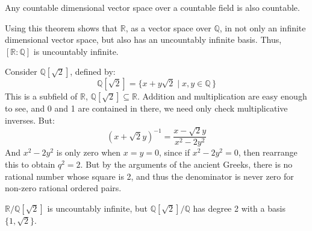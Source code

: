     \begin{theorem}
        Any countable dimensional vector space over a countable field is
        also countable.
    \end{theorem}
    \begin{example}
        Using this theorem shows that $\mathbb{R}$, as a vector space
        over $\mathbb{Q}$, in not only an infinite dimensional vector
        space, but also has an uncountably infinite basis.
        Thus, $[\mathbb{R}:\mathbb{Q}]$ is uncountably infinite.
    \end{example}
    \begin{example}
        Consider $\mathbb{Q}[\sqrt{2}]$, defined by:
        \begin{equation}
            \mathbb{Q}[\sqrt{2}]=\{x+y\sqrt{2}\;|\;x,y\in\mathbb{Q}\,\}
        \end{equation}
        This is a subfield of $\mathbb{R}$,
        $\mathbb{Q}[\sqrt{2}]\subseteq\mathbb{R}$. Addition and
        multiplication are easy enough to see, and 0 and 1 are contained
        in there, we need only check multiplicative inverses. But:
        \begin{equation}
            (x+\sqrt{2}y)^{\minus{1}}=\frac{x-\sqrt{2}y}{x^{2}-2y^{2}}
        \end{equation}
        And $x^{2}-2y^{2}$ is only zero when $x=y=0$, since if
        $x^{2}-2y^{2}=0$, then rearrange this to obtain $q^{2}=2$. But
        by the arguments of the ancient Greeks, there is no rational
        number whose square is 2, and thus the denominator is never
        zero for non-zero rational ordered pairs.
    \end{example}
    \begin{example}
        $\mathbb{R}/\mathbb{Q}[\sqrt{2}]$ is uncountably infinite, but
        $\mathbb{Q}[\sqrt{2}]/\mathbb{Q}$ has degree 2 with a basis
        $\{1,\sqrt{2}\}$.
    \end{example}

